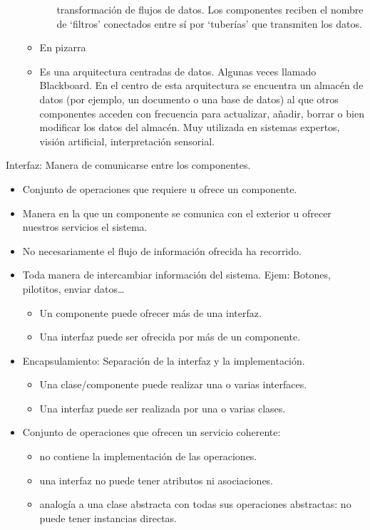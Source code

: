 \documentclass[12pt, twoside, openright]{report} %
\begin{document}
\begin{itemize}
\begin{itemize}
\begin{itemize}
			                  transformación de flujos de datos. Los componentes reciben el
			                  nombre de `filtros' conectados entre sí por `tuberías' que
			                  transmiten los datos.
		            \end{itemize}
		      \item En pizarra
		      \item Es una arquitectura centradas de datos. Algunas veces llamado
		            Blackboard. En el centro de esta arquitectura se encuentra un
		            almacén de datos (por ejemplo, un documento o una base de datos)
		            al que otros componentes acceden con frecuencia para actualizar,
		            añadir, borrar o bien modificar los datos del almacén. Muy
		            utilizada en sistemas expertos, visión artificial, interpretación
		            sensorial.
	      \end{itemize}
\end{itemize}

Interfaz: Manera de comunicarse entre los componentes.
\begin{itemize}
	\item Conjunto de operaciones que requiere u ofrece un componente.
	\item Manera en la que un componente se comunica con el exterior u
	      ofrecer nuestros servicios el sistema.
	\item No necesariamente el flujo de información ofrecida ha recorrido.
	      \pagebreak
	\item Toda manera de intercambiar información del sistema. Ejem:
	      Botones, pilotitos, enviar datos\ldots{}
	      \begin{itemize}
		      \item Un componente puede ofrecer más de una interfaz.
		      \item Una interfaz puede ser ofrecida por más de un componente.
	      \end{itemize}
	\item Encapsulamiento: Separación de la interfaz y la implementación.
	      \begin{itemize}
		      \item Una clase/componente puede realizar una o varias interfaces.
		      \item Una interfaz puede ser realizada por una o varias clases.
	      \end{itemize}
	\item Conjunto de operaciones que ofrecen un servicio coherente:
	      \begin{itemize}
		      \item no contiene la implementación de las operaciones.
		      \item una interfaz no puede tener atributos ni asociaciones.
		      \item analogía a una clase abstracta con todas sus operaciones
		            abstractas: no puede tener instancias directas.
	      \end{itemize}
\end{itemize}
\end{document}
